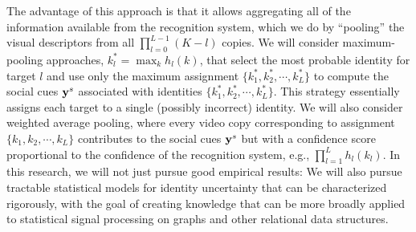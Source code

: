 The advantage of this approach is that it allows aggregating all of the information available from the recognition system, which we do by ``pooling'' the visual descriptors from all $\prod_{l=0}^{L-1}(K-l)$ copies. We will consider maximum-pooling approaches, $k_l^{*}=\max_{k}h_l(k)$, that select the most probable identity for target $l$ and use only the maximum assignment $\{k_1^{*}, k_2^{*}, \cdots, k_L^{*}\}$ to compute the social cues ${\bf y}^s$ associated with identities $\{k_1^{*}, k_2^{*}, \cdots, k_L^{*}\}$. This strategy essentially assigns each target to a single (possibly incorrect) identity. We will also consider weighted average pooling, where every video copy corresponding to assignment $\{k_1, k_2, \cdots, k_L\}$ contributes to the social cues ${\bf y}^s$ but with a confidence score proportional to the confidence of the recognition system, e.g., $\prod_{l=1}^{L}h_l(k_l)$. In this research, we will not just pursue good empirical results: We will also pursue tractable statistical models for identity uncertainty that can be characterized rigorously, with the goal of creating knowledge that can be more broadly applied to statistical signal processing on graphs and other relational data structures. 